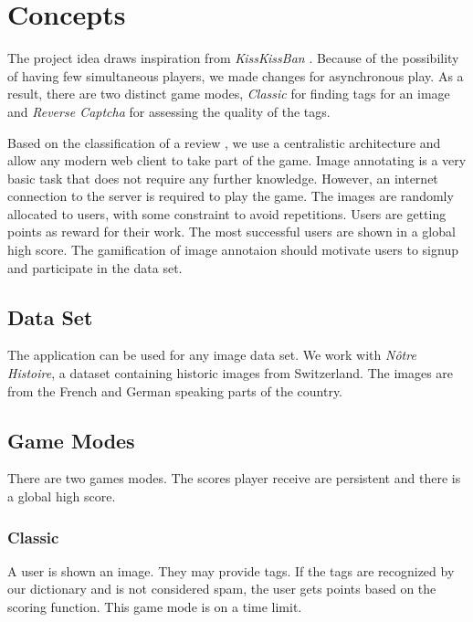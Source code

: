 \section{Concepts}
\label{gacomphs19:sec:concepts}

The project idea draws inspiration from \textit{KissKissBan} \cite{10.1145/1600150.1600153}.
Because of the possibility of having few simultaneous players, we made changes for asynchronous play. As a result, there are two distinct game modes, \emph{Classic} for finding tags for an image and \emph{Reverse Captcha} for assessing the quality of the tags.

Based on the classification of a review \cite{8566148}, we use a centralistic architecture and allow any modern web client to take part of the game. Image annotating is a very basic task that does not require any further knowledge. However, an internet connection to the server is required to play the game. The images are randomly allocated to users, with some constraint to avoid repetitions.
Users are getting points as reward for their work. The most successful users are shown in a global high score. The gamification of image annotaion should motivate users to signup and participate in the data set.


\subsection{Data Set}
\label{gacomphs19:sec:concepts:dataset}
The application can be used for any image data set. We work with \textit{Nôtre Histoire}, a dataset containing historic images from Switzerland. The images are from the French and German speaking parts of the country.

\subsection{Game Modes}
\label{gacomphs19:sec:concepts:gamemodes}

There are two games modes. The scores player receive are persistent and there is a global high score.

\subsubsection{Classic}
\label{gacomphs19:sec:concepts:gamemodes:classic}
A user is shown an image. They may provide tags. If the tags are recognized by our dictionary and is not considered spam, the user gets points based on the scoring function.
This game mode is on a time limit.


